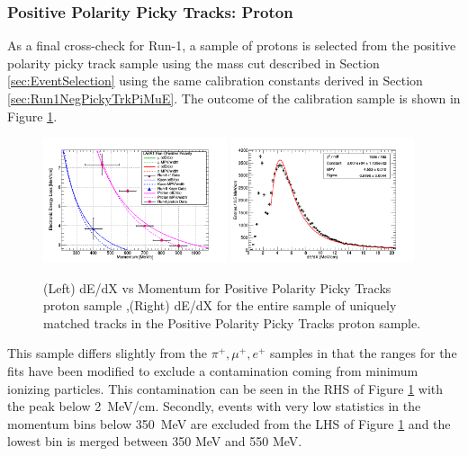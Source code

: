 \subsubsection{Positive Polarity Picky Tracks: Proton}\label{sec:Run1PosPickyTrkProton}

As a final cross-check for Run-1, a sample of protons is selected from the positive polarity picky track sample using the mass cut described in Section \ref{sec:EventSelection} using the same calibration constants derived in Section \ref{sec:Run1NegPickyTrkPiMuE}. The outcome of the calibration sample is shown in Figure \ref{fig:Run1PosPickyTrkProtonResults}.

\begin{figure}[htb]
\centering
\includegraphics[width=0.48\textwidth]{images/dEdXvsMomentumPosPolRun1ProtonFineBin.png}
\includegraphics[width=0.48\textwidth]{images/dEdXPosPolRun1Proton.png}
\caption{(Left) dE/dX vs Momentum for Positive Polarity Picky Tracks proton sample ,(Right) dE/dX for the entire sample of uniquely matched tracks in the Positive Polarity Picky Tracks proton sample.}
\label{fig:Run1PosPickyTrkProtonResults}
\end{figure}

This sample differs slightly from the $\pi^{+}, \mu^{+}, e^{+}$ samples in that the ranges for the fits have been modified to exclude a contamination coming from minimum ionizing particles. This contamination can be seen in the RHS of Figure \ref{fig:Run1PosPickyTrkProtonResults} with the peak below 2~MeV/cm. Secondly, events with very low statistics in the momentum bins below 350~MeV are excluded from the LHS of Figure \ref{fig:Run1PosPickyTrkProtonResults} and the lowest bin is merged between 350 MeV and 550 MeV.

